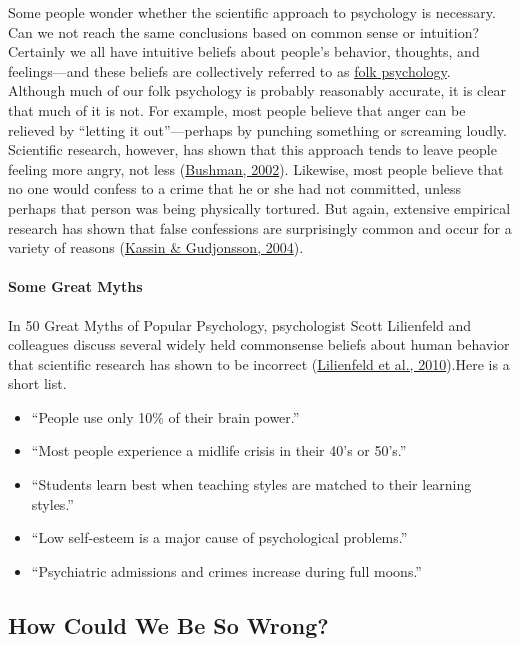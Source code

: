 \documentclass[
]{krantz}
\providecommand{\tightlist}{%
  \setlength{\itemsep}{0pt}\setlength{\parskip}{0pt}}
\begin{document}
Some people wonder whether the scientific approach to psychology is necessary. Can we not reach the same conclusions based on common sense or intuition? Certainly we all have intuitive beliefs about people's behavior, thoughts, and feelings---and these beliefs are collectively referred to as \protect\hyperlink{folk-psychology}{folk psychology}. Although much of our folk psychology is probably reasonably accurate, it is clear that much of it is not. For example, most people believe that anger can be relieved by ``letting it out''---perhaps by punching something or screaming loudly. Scientific research, however, has shown that this approach tends to leave people feeling more angry, not less (\protect\hyperlink{ref-bushman2002does}{Bushman, 2002}). Likewise, most people believe that no one would confess to a crime that he or she had not committed, unless perhaps that person was being physically tortured. But again, extensive empirical research has shown that false confessions are surprisingly common and occur for a variety of reasons (\protect\hyperlink{ref-kassin2004psychology}{Kassin \& Gudjonsson, 2004}).

\hypertarget{some-great-myths}{%
\paragraph*{Some Great Myths}\label{some-great-myths}}

In 50 Great Myths of Popular Psychology, psychologist Scott Lilienfeld and colleagues discuss several widely held commonsense beliefs about human behavior that scientific research has shown to be incorrect (\protect\hyperlink{ref-lilienfeld2010five}{Lilienfeld et al., 2010}).Here is a short list.

\begin{itemize}
\tightlist
\item
  ``People use only 10\% of their brain power.''
\item
  ``Most people experience a midlife crisis in their 40's or 50's.''
\item
  ``Students learn best when teaching styles are matched to their learning styles.''
\item
  ``Low self-esteem is a major cause of psychological problems.''
\item
  ``Psychiatric admissions and crimes increase during full moons.''
\end{itemize}

\hypertarget{how-could-we-be-so-wrong}{%
\subsection*{How Could We Be So Wrong?}\label{how-could-we-be-so-wrong}}
\end{document}
